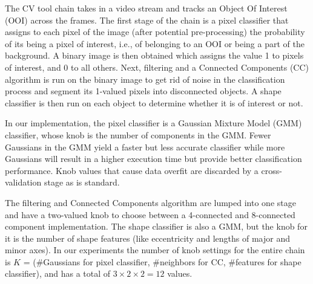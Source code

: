 The CV tool chain takes in a video stream and tracks an Object Of Interest (OOI) across the frames. 
The first stage of the chain is a pixel classifier that assigns to each pixel of the image (after potential pre-processing) the probability of its being a pixel of interest, i.e., of belonging to an OOI or being a part of the background. 
A binary image is then obtained which assigns the value 1 to pixels of interest, and 0 to all others. 
Next, filtering and a Connected Components (CC) algorithm is run on the binary image to get rid of noise in the classification process and segment its 1-valued pixels into disconnected objects. 
A shape classifier is then run on each object to determine whether it is of interest or not.

In our implementation, the pixel classifier is a Gaussian Mixture Model (GMM) classifier, whose knob is the number of components in the GMM. 
Fewer Gaussians in the GMM yield a faster but less accurate classifier while more Gaussians will result in a higher execution time but provide better classification performance. 
Knob values that cause data overfit are discarded by a cross-validation stage as is standard.

The filtering and Connected Components algorithm are lumped into one stage and have a two-valued knob to choose between a 4-connected and 8-connected component implementation. 
The shape classifier is also a GMM, but the knob for it is the number of shape features (like eccentricity and lengths of major and minor axes).
In our experiments the number of knob settings for the entire chain is $K$ = (\#Gaussians for pixel classifier, \#neighbors for CC, \#features for shape classifier), and has a total of $3 \times 2 \times 2 = 12$ values.

